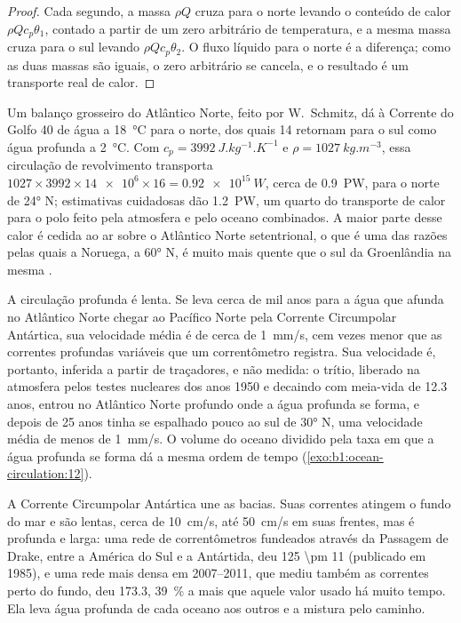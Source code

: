 \begin{proof}
Cada segundo, a massa $\rho Q$ cruza para o norte levando o conteúdo de calor $\rho Q
c_p\theta_1$, contado a partir de um zero arbitrário de temperatura, e a mesma massa
cruza para o sul levando $\rho Q c_p\theta_2$. O fluxo líquido para o norte é a
diferença; como as duas massas são iguais, o zero arbitrário se cancela, e o
resultado é um transporte real de calor.
\end{proof}

Um balanço grosseiro do Atlântico Norte, feito por W.~Schmitz, dá à Corrente do Golfo
\qty{40}{\sverdrup} de água a \qty{18}{\celsius} para o norte, dos quais
\qty{14}{\sverdrup} retornam para o sul como água profunda a \qty{2}{\celsius}. Com $c_p =
\qty{3992}{J.kg^{-1}.K^{-1}}$ e $\rho = \qty{1027}{kg.m^{-3}}$, essa circulação de revolvimento
transporta $1027 \times 3992 \times \num{14e6} \times 16 = \qty{0.92e15}{W}$, cerca de
\qty{0.9}{PW}, para o norte de \ang{24} N; estimativas cuidadosas dão \qty{1.2}{PW}, um
quarto do transporte de calor para o polo feito pela atmosfera e pelo oceano
combinados. A maior parte desse calor é cedida ao ar sobre o Atlântico Norte setentrional,
o que é uma das razões pelas quais a Noruega, a \ang{60} N, é muito mais quente que o sul da
Groenlândia na mesma .

A circulação profunda é lenta. Se leva cerca de mil anos para a água que afunda
no Atlântico Norte chegar ao Pacífico Norte pela Corrente Circumpolar Antártica,
sua velocidade média é de cerca de \qty{1}{mm/s}, cem vezes menor que as
correntes profundas variáveis que um correntômetro registra. Sua velocidade é, portanto, inferida
a partir de traçadores, e não medida: o trítio, liberado na atmosfera pelos testes
nucleares dos anos 1950 e decaindo com meia-vida de 12.3 anos, entrou no
Atlântico Norte profundo onde a água profunda se forma, e depois de 25 anos tinha se espalhado pouco
ao sul de \ang{30} N, uma velocidade média de menos de \qty{1}{mm/s}. O volume do oceano
dividido pela taxa em que a água profunda se forma dá a mesma ordem de tempo
(\cref{exo:b1:ocean-circulation:12}).

A Corrente Circumpolar Antártica une as bacias. Suas correntes atingem o fundo do mar
e são lentas, cerca de \qty{10}{cm/s}, até \qty{50}{cm/s} em suas frentes, mas é
profunda e larga: uma rede de correntômetros fundeados através da Passagem de Drake,
entre a América do Sul e a Antártida, deu \qty[uncertainty-mode=separate]{125 \pm
11}{\sverdrup} (publicado em 1985), e uma rede mais densa em 2007--2011,
que mediu também as correntes perto do fundo, deu \qty{173.3}{\sverdrup},
\qty{39}{\percent} a mais que aquele valor usado há muito tempo. Ela leva água profunda de cada
oceano aos outros e a mistura pelo caminho.

